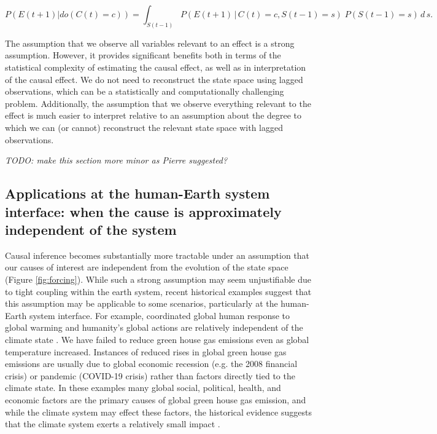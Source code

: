 \documentclass[12pt]{article}
\begin{document}
\begin{equation}
  P(E(t+1)| do(C(t)=c)) = \int_{S(t-1)} P(E(t+1) \, | \, C(t)=c,
  S(t-1) = s
  )\; P(S(t-1)=s) \, d \, s.
\end{equation}

The assumption that we observe all variables relevant to an effect is
a strong assumption. However, it provides significant benefits both in
terms of the statistical complexity of estimating the causal effect,
as well as in interpretation of the causal effect. We do not need to
reconstruct the state space  using lagged observations, which can be a
statistically and computationally challenging problem. Additionally,
the assumption that we observe everything relevant to the effect is
much easier to interpret relative to an assumption about the degree to
which we can (or cannot) reconstruct the relevant state space with
lagged observations.

\textit{TODO: make this section more minor as Pierre suggested?}
\subsection{Applications at the human-Earth system interface: when the
  cause is approximately independent of the system}
\label{human}

Causal inference becomes substantially more tractable under an
assumption that our causes of interest are independent from the
evolution of the state space (Figure \ref{fig:forcing}). While such a
strong assumption may seem unjustifiable due to tight coupling within
the earth system, recent historical examples suggest that this
assumption may be applicable to some scenarios, particularly at the
human-Earth system interface. For example, coordinated global human
response to global warming and humanity's global actions are
relatively independent of the climate state
\citep{arto2014drivers}. We have failed to reduce green house gas
emissions even as global temperature increased. Instances of reduced
rises in global green house gas emissions are usually due to global
economic recession (e.g. the 2008 financial crisis) or pandemic
(COVID-19 crisis) rather than factors directly tied to the climate
state. In these examples many global social, political, health, and
economic factors are the primary causes of global green house gas
emission, and while the climate system may effect these factors, the
historical evidence suggests that the climate system exerts a
relatively small impact \citep{arto2014drivers}.
\end{document}
